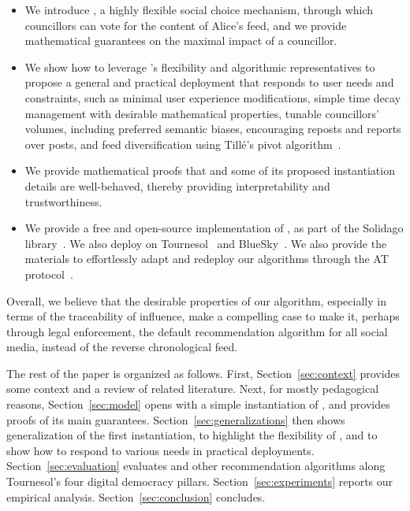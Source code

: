\begin{itemize}
    \item We introduce \Veche{}, a highly flexible social choice mechanism,
    through which councillors can vote for the content of Alice's feed,
    and we provide mathematical guarantees on the maximal impact of a councillor.
    \item We show how to leverage \Veche{}'s flexibility and algorithmic representatives
    to propose a general and practical deployment that responds to user needs and constraints,
    such as minimal user experience modifications,
    simple time decay management with desirable mathematical properties,
    tunable councillors' volumes,
    including preferred semantic biases,
    encouraging reposts and reports over posts,
    and feed diversification using Tillé's pivot algorithm~\CITE{}.
    \item We provide mathematical proofs that \Veche{} 
    and some of its proposed instantiation details are well-behaved,
    thereby providing interpretability and trustworthiness.
    \item We provide a free and open-source implementation of \Veche{},
    as part of the Solidago library~\cite{hoang2022solidago}.
    We also deploy \Veche{} on Tournesol~\cite{hoang2025tournesol} and BlueSky~\cite{kleppmann2024bluesky}.
    We also provide the materials to effortlessly 
    adapt and redeploy our algorithms through the AT protocol~\cite{kleppmann2024bluesky}.
\end{itemize}

Overall, we believe that the desirable properties of our algorithm,
especially in terms of the traceability of influence,
make a compelling case to make it, perhaps through legal enforcement, 
the default recommendation algorithm for all social media,
instead of the reverse chronological feed.

The rest of the paper is organized as follows.
First, Section~\ref{sec:context} provides some context and a review of related literature.
Next, for mostly pedagogical reasons,
Section~\ref{sec:model} opens with a simple instantiation of \Veche{}, 
and provides proofs of its main guarantees.
Section~\ref{sec:generalizations} then shows generalization of the first instantiation,
to highlight the flexibility of \Veche{},
and to show how to respond to various needs in practical deployments.
Section~\ref{sec:evaluation} evaluates \Veche{} and other recommendation algorithms
along Tournesol's four digital democracy pillars.
Section~\ref{sec:experiments} reports our empirical analysis.
Section~\ref{sec:conclusion} concludes.
